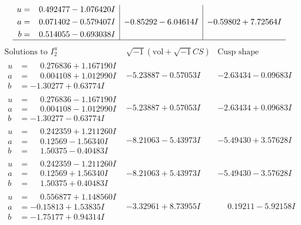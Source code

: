 \documentclass[1p]{elsarticle_modified}
\theoremstyle{definition}
\newcommand{\I}{\sqrt{-1}}
\begin{document}
$$\begin{array}{c|c|c}
\begin{aligned}
u &= \phantom{-}0.492477 - 1.076420 I \\
a &= \phantom{-}0.071402 - 0.579407 I \\
b &= \phantom{-}0.514055 - 0.693038 I\end{aligned}
 & -0.85292 - 6.04614 I & -0.59802 + 7.72564 I\\
 \hline 
 \end{array}$$\newpage$$\begin{array}{c|c|c}  
\text{Solutions to }I^u_{2}& \I (\text{vol} + \sqrt{-1}CS) & \text{Cusp shape}\\
 \hline 
\begin{aligned}
u &= \phantom{-}0.276836 + 1.167190 I \\
a &= \phantom{-}0.004108 + 1.012990 I \\
b &= -1.30277 + 0.63774 I\end{aligned}
 & -5.23887 - 0.57053 I & -2.63434 - 0.09683 I \\ \hline\begin{aligned}
u &= \phantom{-}0.276836 - 1.167190 I \\
a &= \phantom{-}0.004108 - 1.012990 I \\
b &= -1.30277 - 0.63774 I\end{aligned}
 & -5.23887 + 0.57053 I & -2.63434 + 0.09683 I \\ \hline\begin{aligned}
u &= \phantom{-}0.242359 + 1.211260 I \\
a &= \phantom{-}0.12569 - 1.56340 I \\
b &= \phantom{-}1.50375 - 0.40483 I\end{aligned}
 & -8.21063 - 5.43973 I & -5.49430 + 3.57628 I \\ \hline\begin{aligned}
u &= \phantom{-}0.242359 - 1.211260 I \\
a &= \phantom{-}0.12569 + 1.56340 I \\
b &= \phantom{-}1.50375 + 0.40483 I\end{aligned}
 & -8.21063 + 5.43973 I & -5.49430 - 3.57628 I \\ \hline\begin{aligned}
u &= \phantom{-}0.556877 + 1.148560 I \\
a &= -0.15813 + 1.53835 I \\
b &= -1.75177 + 0.94314 I\end{aligned}
 & -3.32961 + 8.73955 I & \phantom{-}0.19211 - 5.92158 I \\ \hline\begin{aligned}

\end{aligned}
\end{array}$$
\end{document}
